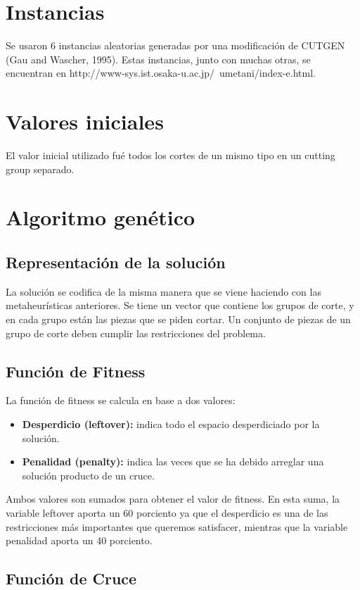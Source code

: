 \documentclass[letter,10pt]{article}
\begin{document}
\section{Instancias}
Se usaron 6 instancias aleatorias generadas por una modificaci\'on de CUTGEN (Gau and Wascher, 1995).
Estas instancias, junto con muchas otras, se encuentran en http://www-sys.ist.osaka-u.ac.jp/~umetani/index-e.html.

\section{Valores iniciales}
El valor inicial utilizado fu\'e todos los cortes de un mismo tipo en un cutting group separado.

\section{Algoritmo genético}

\subsection{Representación de la solución}
La solución se codifica de la misma manera que se viene haciendo con las metaheurísticas anteriores. 
Se tiene un vector que contiene los grupos de corte, y en cada grupo están las piezas que se piden 
cortar. Un conjunto de piezas de un grupo de corte deben cumplir las restricciones del problema.

\subsection{Función de Fitness}
La función de fitness se calcula en base a dos valores:
\begin{itemize}
 \item \textbf{Desperdicio (leftover):} indica todo el espacio desperdiciado por la solución. 
  \item \textbf{Penalidad (penalty):} indica las veces que se ha debido arreglar una solución producto de un cruce.
\end{itemize}

Ambos valores son sumados para obtener el valor de fitness. En esta suma, la variable leftover aporta un 60 porciento ya que 
el desperdicio es una de las restricciones más importantes que queremos satisfacer, mientras que la variable penalidad aporta 
un 40 porciento.

\subsection{Función de Cruce}
\end{document}
